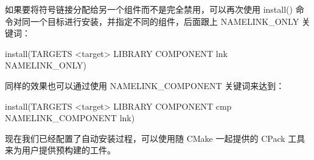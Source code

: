 如果要将符号链接分配给另一个组件而不是完全禁用，可以再次使用 install() 命令对同一个目标进行安装，并指定不同的组件，后面跟上 NAMELINK\_ONLY 关键词：

\begin{shell}
install(TARGETS <target> LIBRARY
        COMPONENT lnk NAMELINK_ONLY)
\end{shell}

同样的效果也可以通过使用 NAMELINK\_COMPONENT 关键词来达到：

\begin{shell}
install(TARGETS <target> LIBRARY
        COMPONENT cmp NAMELINK_COMPONENT lnk)
\end{shell}

现在我们已经配置了自动安装过程，可以使用随 CMake 一起提供的 CPack 工具来为用户提供预构建的工件。








































